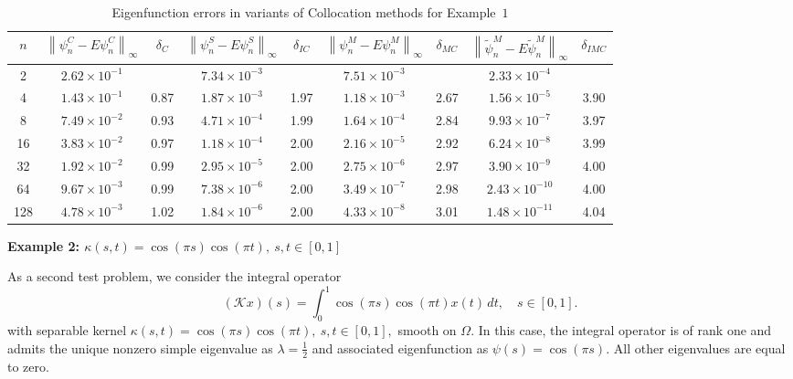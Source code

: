\documentclass[]{interact}
\renewcommand{\arraystretch}{1.32}
\theoremstyle{plain}%
\theoremstyle{definition}
\theoremstyle{remark}
\newcommand{\norm}[1]{\left\lVert #1\right\rVert}
\begin{document}
\begin{table}[h!]
	\small
	\centering
	\setlength{\tabcolsep}{2.3pt}
	\renewcommand{\arraystretch}{1.2}
	\caption{Eigenfunction errors in variants of Collocation methods for Example~$1$}
	\label{table:02}
	\begin{tabular}{|c|cc|cc|cc|cc|}
		\hline
		$n$ & $\norm{\psi_n^C - E \psi_n^C }_\infty$ & $\delta_C$ 
		& $\norm{\psi_n^S - E \psi_n^S }_\infty$ & $\delta_{IC}$ 
		& $\norm{\psi_n^M - E \psi_n^M }_\infty$ & $\delta_{MC}$ 
		& $\norm{\widetilde{\psi}_n^M - E \widetilde{\psi}_n^M }_\infty$ & $\delta_{IMC}$ \\[3.5pt]
		\hline
		2   & $2.62\times10^{-1}$ &      & $7.34\times10^{-3}$ &      & $7.51\times10^{-3}$ &      & $2.33\times10^{-4}$ &      \\[3pt] 
		4   & $1.43\times10^{-1}$ & 0.87 & $1.87\times10^{-3}$ & 1.97 & $1.18\times10^{-3}$ & 2.67 & $1.56\times10^{-5}$ & 3.90 \\[3pt] 
		8   & $7.49\times10^{-2}$ & 0.93 & $4.71\times10^{-4}$ & 1.99 & $1.64\times10^{-4}$ & 2.84 & $9.93\times10^{-7}$ & 3.97 \\[3pt] 
		16  & $3.83\times10^{-2}$ & 0.97 & $1.18\times10^{-4}$ & 2.00 & $2.16\times10^{-5}$ & 2.92 & $6.24\times10^{-8}$ & 3.99 \\[3pt] 
		32  & $1.92\times10^{-2}$ & 0.99 & $2.95\times10^{-5}$ & 2.00 & $2.75\times10^{-6}$ & 2.97 & $3.90\times10^{-9}$ & 4.00 \\[3pt] 
		64  & $9.67\times10^{-3}$ & 0.99 & $7.38\times10^{-6}$ & 2.00 & $3.49\times10^{-7}$ & 2.98 & $2.43\times10^{-10}$ & 4.00 \\[3pt] 
		128 & $4.78\times10^{-3}$ & 1.02 & $1.84\times10^{-6}$ & 2.00 & $4.33\times10^{-8}$ & 3.01 & $1.48\times10^{-11}$ & 4.04 \\[3pt] 
		\hline
	\end{tabular}
\end{table}

\bigskip

\medskip
\noindent
\textbf{Example 2:  $\kappa(s,t)=\cos(\pi s)\cos(\pi t), ~ s,t \in[0,1]$}

\noindent
As a second test problem, we consider the integral operator
\[
(\mathcal{K}x)(s)
=
\int_0^1 \cos(\pi s)\cos(\pi t) x(t)\,dt,
\quad s\in[0,1].
\]
with separable kernel $\kappa(s,t)=\cos(\pi s)\cos(\pi t),~s,t\in[0,1],$ smooth on $\Omega$. In this case, the integral operator is of rank one and admits the unique nonzero simple eigenvalue as $\lambda = \frac{1}{2}$ and associated eigenfunction as $\psi(s) = \cos(\pi s).$ All other eigenvalues are equal to zero.
\end{document}
